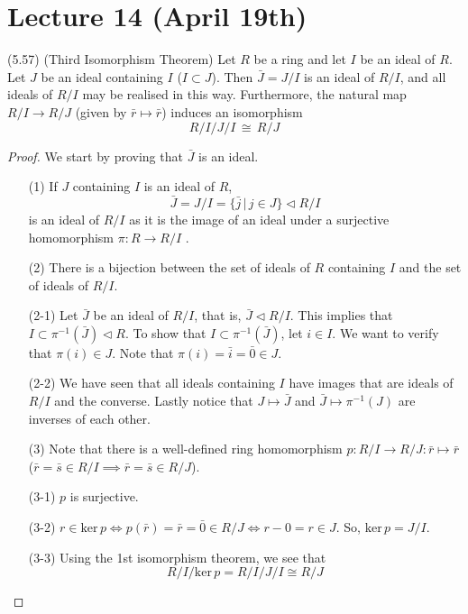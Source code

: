 \section{Lecture 14 (April 19th)}
\begin{thm}
(5.57) (Third Isomorphism Theorem) Let $R$ be a ring and let $I$ be an ideal of $R$. Let $J$ be an ideal containing $I$ ($I\subset J$). Then $\bar{J}=J/I$ is an ideal of $R/I$, and all ideals of $R/I$ may be realised in this way. Furthermore, the natural map $R/I\rightarrow R/J$ (given by $\bar{r}\mapsto \bar{r}$) induces an isomorphism 
\[R/I\Big/J/I\,\cong\, R/J\]
\end{thm}
\vspace{2ex}
\begin{proof}
We start by proving that $\bar{J}$ is an ideal.
\begin{itemize} 
\item[(1)] If $J$ containing $I$ is an ideal of $R$, 
\[\bar{J}=J/I=\{\bar{j} \,|\, j\in J\}\triangleleft R/I\]
is an ideal of $R/I$ as it is the image of an ideal under a surjective homomorphism $\pi :R\rightarrow R/I$ .
\item[(2)] There is a bijection between the set of ideals of $R$ containing $I$ and the set of ideals of $R/I$. 
\item[(2-1)] Let $\bar{J}$ be an ideal of $R/I$, that is, $\bar{J}\triangleleft R/I$. This implies that $ I\subset \pi ^{-1}(\bar{J})\triangleleft R$. To show that $I\subset \pi ^{-1}(\bar{J})$, let $i\in I$. We want to verify that $\pi (i)\in J$. Note that $\pi (i)=\bar{i}=\bar{0}\in J$.
\item[(2-2)] We have seen that all ideals containing $I$ have images that are ideals of $R/I$ and the converse. Lastly notice that $J\mapsto \bar{J}$ and $\bar{J}\mapsto \pi ^{-1}(J)$ are inverses of each other. 
\item[(3)] Note that there is a well-defined ring homomorphism $p:R/I\rightarrow R/J:\bar{r}\mapsto \bar{r}$ ($\bar{r}=\bar{s}\in R/I \implies \bar{r}=\bar{s}\in R/J$).
\item[(3-1)] $p$ is surjective.
\item[(3-2)] $r\in \mathrm{ker}\,p\iff p(\bar{r})=\bar{r}=\bar{0}\in R/J\iff r-0=r\in J$. So, $\mathrm{ker}\,p=J/I$.
\item[(3-3)] Using the 1st isomorphism theorem, we see that
\[R/I\Big/ \mathrm{ker}\,p=R/I\Big/ J/I\cong R/J\]

\end{itemize}
\end{proof}
